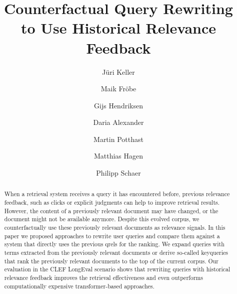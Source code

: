 \title{Counterfactual Query Rewriting \\ to Use Historical Relevance Feedback}

\author{
    Jüri Keller  \and
    Maik Fr{\"{o}}be  \and
    Gijs Hendriksen  \and
    Daria Alexander  \and
    Martin Potthast  \and
    Matthias Hagen  \and
    Philipp Schaer  
}



\maketitle

\begin{abstract}
    When a retrieval system receives a query it has encountered before, previous relevance feedback, such as clicks or explicit judgments can help to improve retrieval results. However, the content of a previously relevant document may have changed, or the document might not be available anymore. Despite this evolved corpus, we counterfactually use these previously relevant documents as relevance signals. In this paper we proposed approaches to rewrite user queries and compare them against a system that directly uses the previous qrels for the ranking. We expand queries with terms extracted from the previously relevant documents or derive so-called keyqueries that rank the previously relevant documents to the top of the current corpus. Our evaluation in the CLEF LongEval scenario shows that rewriting queries with historical relevance feedback improves the retrieval effectiveness and even outperforms computationally expensive transformer-based approaches.
\end{abstract}



